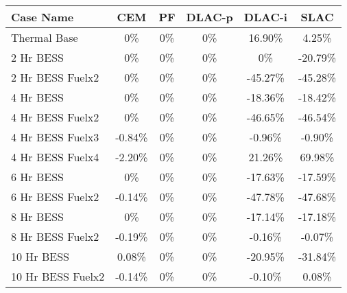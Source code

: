 \begin{tabular}{lccccc}
\toprule
Case Name & CEM & PF & DLAC-p & DLAC-i & SLAC \\
\midrule
Thermal Base & 0\% & 0\% & 0\% & 16.90\% & 4.25\% \\
2 Hr BESS & 0\% & 0\% & 0\% & 0\% & -20.79\% \\
2 Hr BESS Fuelx2 & 0\% & 0\% & 0\% & -45.27\% & -45.28\% \\
4 Hr BESS & 0\% & 0\% & 0\% & -18.36\% & -18.42\% \\
4 Hr BESS Fuelx2 & 0\% & 0\% & 0\% & -46.65\% & -46.54\% \\
4 Hr BESS Fuelx3 & -0.84\% & 0\% & 0\% & -0.96\% & -0.90\% \\
4 Hr BESS Fuelx4 & -2.20\% & 0\% & 0\% & 21.26\% & 69.98\% \\
6 Hr BESS & 0\% & 0\% & 0\% & -17.63\% & -17.59\% \\
6 Hr BESS Fuelx2 & -0.14\% & 0\% & 0\% & -47.78\% & -47.68\% \\
8 Hr BESS & 0\% & 0\% & 0\% & -17.14\% & -17.18\% \\
8 Hr BESS Fuelx2 & -0.19\% & 0\% & 0\% & -0.16\% & -0.07\% \\
10 Hr BESS & 0.08\% & 0\% & 0\% & -20.95\% & -31.84\% \\
10 Hr BESS Fuelx2 & -0.14\% & 0\% & 0\% & -0.10\% & 0.08\% \\
\bottomrule
\end{tabular}
